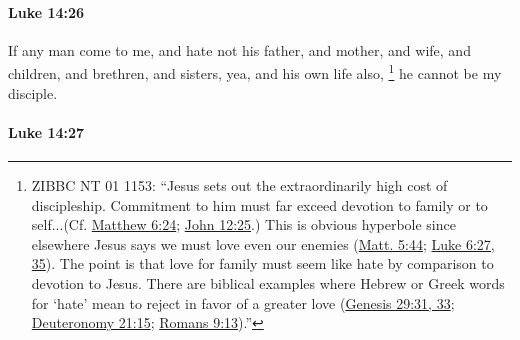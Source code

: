 		\paragraph{Luke 14:26} %
			\label{LUKE-14-26}

			If any man come to me, and hate not his father, and mother, and wife, and children, and brethren, and sisters, yea, and his own life also,%
				\footnote{%
					ZIBBC NT 01 1153: ``Jesus sets out the extraordinarily high cost of discipleship. Commitment to him must far exceed devotion to family or to self...(Cf. \hyperref[MATTHEW-6-24]{Matthew 6:24}; \hyperref[JOHN-12-15]{John 12:25}.) This is obvious hyperbole since elsewhere Jesus says we must love even our enemies (\hyperref[MATTHEW-5-44]{Matt. 5:44}; \hyperref[LUKE-6-27]{Luke 6:27, 35}). The point is that love for family must seem like hate by comparison to devotion to Jesus. There are biblical examples where Hebrew or Greek words for `hate' mean to reject in favor of a greater love (\hyperref[GENESIS-29-31]{Genesis 29:31, 33}; \hyperref[DEUTERONOMY-21-15]{Deuteronomy 21:15}; \hyperref[ROMANS-9-13]{Romans 9:13}).''
					}
			he cannot be my disciple.

			\begin{framed}
			\scriptsize
				\begin{compactdesc}
					\item[SBLG] 
				\end{compactdesc}
			\end{framed}

		\paragraph{Luke 14:27} %
			\label{LUKE-14-27}

